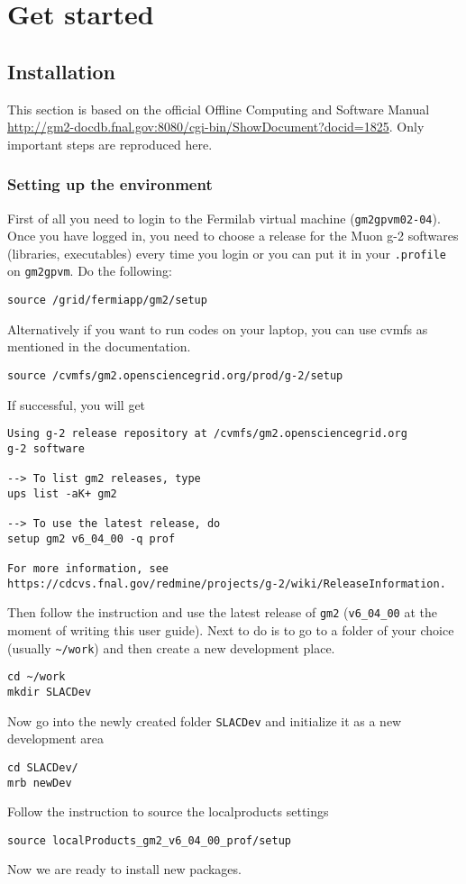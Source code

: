 \chapter{Get started}
\label{chap:getstarted}

\section{Installation}

This section is based on the official Offline Computing and Software Manual \url{http://gm2-docdb.fnal.gov:8080/cgi-bin/ShowDocument?docid=1825}.
Only important steps are reproduced here.

\subsection{Setting up the environment}

First of all you need to login to the Fermilab virtual machine (\verb+gm2gpvm02-04+).
Once you have logged in, you need to choose a release for the Muon g-2 softwares (libraries, executables)
every time you login or you can put it in your \verb+.profile+ on \verb+gm2gpvm+. Do the following:
%
\begin{Verbatim}[frame=single]
source /grid/fermiapp/gm2/setup
\end{Verbatim}
%
Alternatively if you want to run codes on your laptop, you can use cvmfs as mentioned in the documentation.
%
\begin{Verbatim}[frame=single]
source /cvmfs/gm2.opensciencegrid.org/prod/g-2/setup
\end{Verbatim}
%
If successful, you will get
%
\begin{Verbatim}[frame=single]
Using g-2 release repository at /cvmfs/gm2.opensciencegrid.org
g-2 software

--> To list gm2 releases, type
ups list -aK+ gm2

--> To use the latest release, do
setup gm2 v6_04_00 -q prof

For more information, see
https://cdcvs.fnal.gov/redmine/projects/g-2/wiki/ReleaseInformation.
\end{Verbatim}
%
Then follow the instruction and use the latest release of \verb+gm2+ (\verb+v6_04_00+ at the moment of writing this user guide).
Next to do is to go to a folder of your choice (usually \verb+~/work+) and then create a new development place.
%
\begin{Verbatim}[frame=single]
cd ~/work
mkdir SLACDev
\end{Verbatim}
%
Now go into the newly created folder \verb+SLACDev+ and initialize it as a new development area
%
\begin{Verbatim}[frame=single]
cd SLACDev/
mrb newDev
\end{Verbatim}
%
Follow the instruction to source the localproducts settings
%
\begin{Verbatim}[frame=single]
source localProducts_gm2_v6_04_00_prof/setup
\end{Verbatim}
%
Now we are ready to install new packages.

